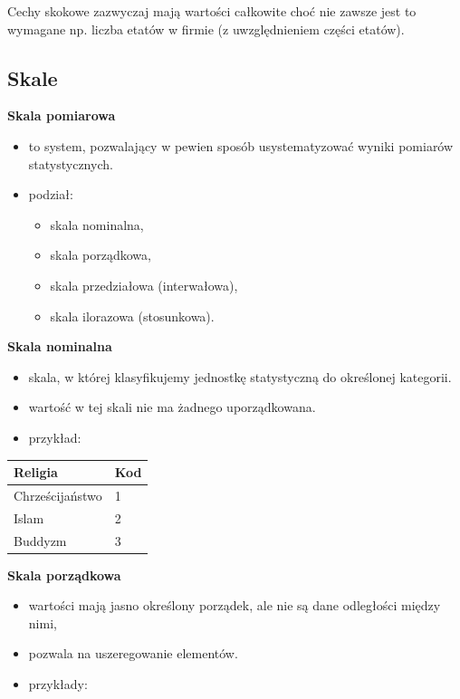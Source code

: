 \documentclass[
  polish,
  letterpaper,
  DIV=11,
  numbers=noendperiod]{scrreprt}
\newcounter{none} %
\providecommand{\tightlist}{%
  \setlength{\itemsep}{0pt}\setlength{\parskip}{0pt}}
\begin{document}
Cechy skokowe zazwyczaj mają wartości całkowite choć nie zawsze jest to
wymagane np. liczba etatów w firmie (z uwzględnieniem części etatów).

\subsection{Skale}\label{skale}

\textbf{Skala pomiarowa}

\begin{itemize}
\tightlist
\item
  to system, pozwalający w pewien sposób usystematyzować wyniki pomiarów
  statystycznych.
\item
  podział:

  \begin{itemize}
  \tightlist
  \item
    skala nominalna,
  \item
    skala porządkowa,
  \item
    skala przedziałowa (interwałowa),
  \item
    skala ilorazowa (stosunkowa).
  \end{itemize}
\end{itemize}

\textbf{Skala nominalna}

\begin{itemize}
\tightlist
\item
  skala, w której klasyfikujemy jednostkę statystyczną do określonej
  kategorii.
\item
  wartość w tej skali nie ma żadnego uporządkowana.
\item
  przykład:
\end{itemize}

{\def\LTcaptype{none} %
\begin{longtable}[]{@{}ll@{}}
\toprule\noalign{}
Religia & Kod \\
\midrule\noalign{}
\endhead
\bottomrule\noalign{}
\endlastfoot
Chrześcijaństwo & 1 \\
Islam & 2 \\
Buddyzm & 3 \\
\end{longtable}
}

\textbf{Skala porządkowa}

\begin{itemize}
\tightlist
\item
  wartości mają jasno określony porządek, ale nie są dane odległości
  między nimi,
\item
  pozwala na uszeregowanie elementów.
\item
  przykłady:
\end{itemize}
\end{document}
